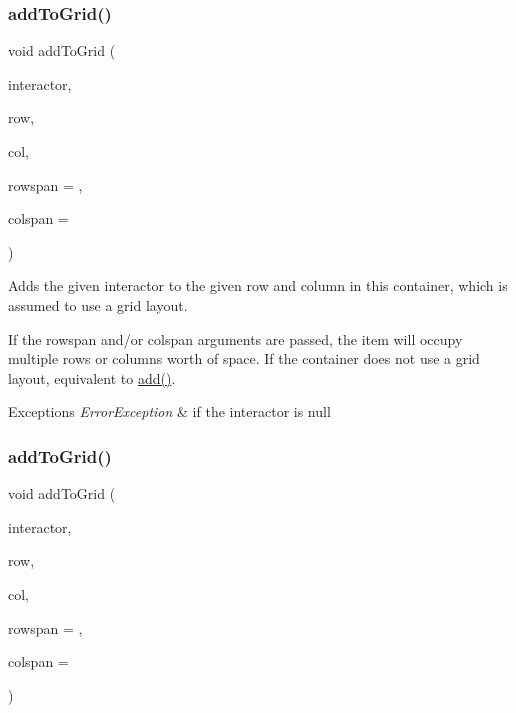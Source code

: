 \subsubsection{\texorpdfstring{add\+To\+Grid()}{addToGrid()}\hspace{0.1cm}{\footnotesize\ttfamily [1/2]}}
{\footnotesize\ttfamily void add\+To\+Grid (\begin{DoxyParamCaption}\item[{\mbox{\hyperlink{classsgl_1_1GInteractor}{G\+Interactor}} $\ast$}]{interactor,  }\item[{int}]{row,  }\item[{int}]{col,  }\item[{int}]{rowspan = {},  }\item[{int}]{colspan = {} }\end{DoxyParamCaption})\hspace{0.3cm}{\ttfamily [virtual]}}



Adds the given interactor to the given row and column in this container, which is assumed to use a grid layout. 

If the rowspan and/or colspan arguments are passed, the item will occupy multiple rows or columns\textquotesingle{} worth of space. If the container does not use a grid layout, equivalent to \mbox{\hyperlink{classsgl_1_1GContainer_a6f99b7c841256dbdc5acaafbbca4e685}{add()}}. 
\begin{DoxyExceptions}{Exceptions}
{\em Error\+Exception} & if the interactor is null \\
\hline
\end{DoxyExceptions}
\mbox{\label{classsgl_1_1GContainer_abc297ebf9136261c21e2df3c771df0b3}} 
\subsubsection{\texorpdfstring{add\+To\+Grid()}{addToGrid()}\hspace{0.1cm}{\footnotesize\ttfamily [2/2]}}
{\footnotesize\ttfamily void add\+To\+Grid (\begin{DoxyParamCaption}\item[{\mbox{\hyperlink{classsgl_1_1GInteractor}{G\+Interactor}} \&}]{interactor,  }\item[{int}]{row,  }\item[{int}]{col,  }\item[{int}]{rowspan = {},  }\item[{int}]{colspan = {} }\end{DoxyParamCaption})\hspace{0.3cm}{\ttfamily [virtual]}}



